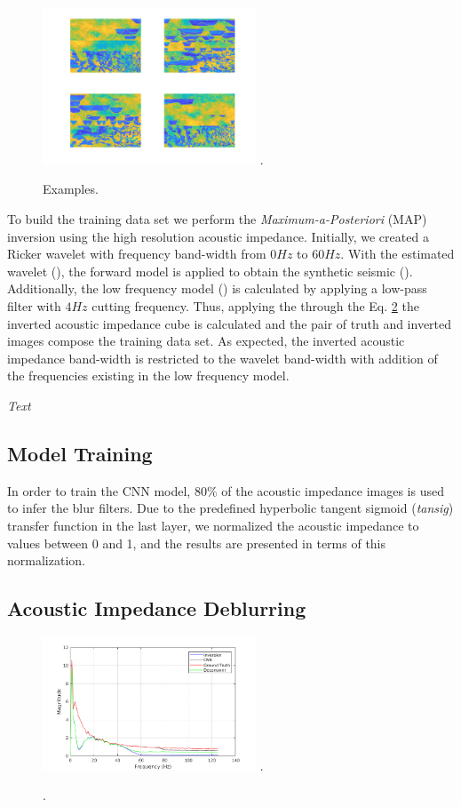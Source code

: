 \documentclass[journal]{IEEEtran}
\begin{document}
\begin{figure}[!t]
\centering
\includegraphics[width=2.5in]{Figs/Examples}
\DeclareGraphicsExtensions.
\caption{Examples.}
\label{fig_examples}
\end{figure}

To build the training data set we perform the \textit{Maximum-a-Posteriori} (MAP) \cite{} inversion using
the high resolution acoustic impedance. Initially, we created a Ricker wavelet with
frequency band-width from $0Hz$ to $60Hz$. With the estimated wavelet (), the forward model
is applied to obtain the synthetic seismic (). Additionally, the low frequency
model () is calculated by applying a low-pass filter with $4Hz$ cutting frequency.
Thus, applying the through the Eq. \ref{} the inverted acoustic impedance cube is calculated and
the pair of truth and inverted images compose the training data set. As expected, the inverted
acoustic impedance band-width is restricted to the wavelet band-width with addition of the 
frequencies existing in the low frequency model.

\textit{Text}

\subsection{Model Training}
In order to train the CNN model, $80\%$ of the acoustic impedance images
is used to infer the blur filters. Due to the predefined hyperbolic tangent
sigmoid (\textit{tansig}) transfer function in the last layer, we
normalized the acoustic impedance to values between 0 and 1,
and the results are presented in terms of this normalization.


\subsection{Acoustic Impedance Deblurring}


\begin{figure}[!t]
	\centering
	\includegraphics[width=2.5in]{Figs/Frequencies}
	\DeclareGraphicsExtensions.
	\caption{.}
	\label{}
\end{figure}
\end{document}
